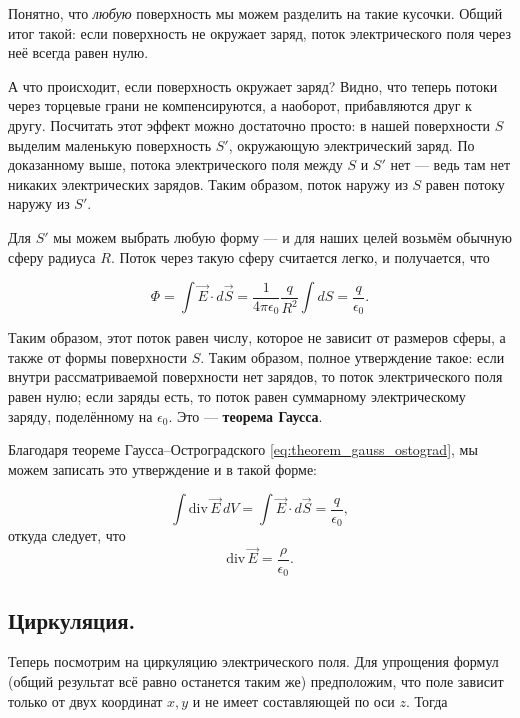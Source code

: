 \documentclass[a4paper,12pt]{article}
\numberwithin{equation}{section}
\newcommand{\eps}{\epsilon}
\renewcommand{\div}{\mathrm{div}\,}
\begin{document}
Понятно, что \textit{любую} поверхность мы можем разделить на такие
кусочки. Общий итог такой: если поверхность не окружает заряд, поток
электрического поля через неё всегда равен нулю.

А что происходит, если поверхность окружает заряд? Видно, что теперь
потоки через торцевые грани не компенсируются, а наоборот,
прибавляются друг к другу. Посчитать этот эффект можно достаточно
просто: в нашей поверхности $S$ выделим маленькую поверхность $S'$,
окружающую электрический заряд. По доказанному выше, потока
электрического поля между $S$ и $S'$ нет --- ведь там нет никаких
электрических зарядов. Таким образом, поток наружу из $S$ равен потоку
наружу из $S'$. 

Для $S'$ мы можем выбрать любую форму --- и для наших целей возьмём
обычную сферу радиуса $R$. Поток через такую сферу считается легко, и
получается, что

\begin{equation}
  \label{eq:flux_gauss_1}
  \Phi = \int \vec{E} \cdot d\vec{S} = \frac{1}{4\pi \eps_0}
  \frac{q}{R^2} \int dS = \frac{q}{\eps_0}.
\end{equation}

Таким образом, этот поток равен числу, которое не зависит от размеров
сферы, а также от формы поверхности $S$. Таким образом, полное
утверждение такое: если внутри рассматриваемой поверхности нет
зарядов, то поток электрического поля равен нулю; если заряды есть, то
поток равен суммарному электрическому заряду, поделённому на
$\eps_0$. Это --- \textbf{теорема Гаусса}. 

Благодаря теореме Гаусса--Остроградского
\eqref{eq:theorem_gauss_ostograd}, мы можем записать это утверждение и
в такой форме: 

\begin{equation}
  \label{eq:flux_gauss_2}
  \int \div \vec{E} \, dV = \int \vec{E} \cdot d\vec{S} = \frac{q}{\eps_0},
\end{equation}
откуда следует, что
\begin{equation}
  \label{eq:flux_gauss_3}
  \div \vec{E} = \frac{\rho}{\eps_0}.
\end{equation}

\subsection{Циркуляция.}
\label{sec:circulation}

Теперь посмотрим на циркуляцию электрического поля. Для упрощения
формул (общий результат всё равно останется таким же) предположим, что
поле зависит только от двух координат $x,y$ и не имеет составляющей по
оси $z$. Тогда
\end{document}
